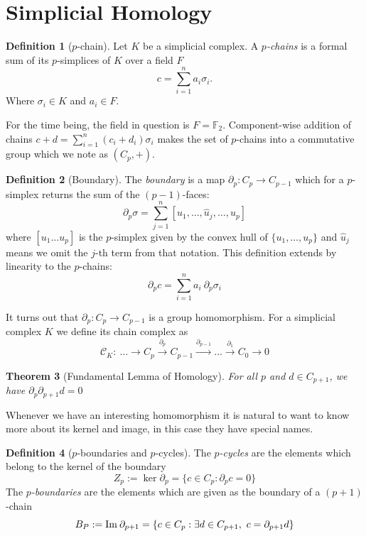 \documentclass{article}
\newcommand{\img}{\textmd{Im}\:}
\theoremstyle{plain}
\newtheorem{thm}{Theorem}[section]
\theoremstyle{definition}
\newtheorem{definition}[thm]{Definition}
\theoremstyle{remark}
\begin{document}
	\section{Simplicial Homology}
	\begin{definition}[$p$-chain]
		Let $K$ be a simplicial complex. A \emph{$ p $-chains} is a formal sum of its $p$-simplices of $K$ over a field $F$ \[ c = \sum_{i=1}^{n} a_i \sigma_i. \] Where $\sigma_i \in K$ and $a_i \in F$.
	\end{definition}
	For the time being, the field in question is $F = \mathbb{F}_2 $. Component-wise addition of chains $ c + d = \sum_{i=1}^n (c_i + d_i) \sigma_i $ makes the set of $p$-chains into a commutative group which we note as $ (C_p, +) $.
\begin{definition}[Boundary]
	The \emph{boundary} is a map $ \partial_p : C_p \to C_{p-1} $ which for a $p$-simplex returns the sum of the $ (p-1) $-faces: \[ \partial_p \sigma = \sum_{j=1}^n [u_1, \dots , \hat{u}_j , \dots , u_p] \]
	where $[ u_1 \dots u_p ]$ is the $p$-simplex given by the convex hull of $\{u_1, \dots , u_p\}$ and $\hat{u}_j$ means we omit the $j$-th term from that notation.
	This definition extends by linearity to the $p$-chains: \[ \partial_p c = \sum_{i=1}^{n} a_i \ \partial_p\sigma_i  \]
\end{definition}
It turns out that $ \partial_p : C_p \to C_{p-1} $ is a group homomorphism. For a simplicial complex $K$ we define its chain complex as
\[\mathcal{C}_K: \ \dots \longrightarrow C_p \stackrel{\partial_p}{\longrightarrow} C_{p-1} \stackrel{\partial_{p-1}}{\longrightarrow} \dots \stackrel{\partial_1}{\longrightarrow} C_0 \longrightarrow 0 \]

\begin{thm}[Fundamental Lemma of Homology]For all $p$ and $d \in C_{p+1}$, we have $ \partial_{p} \partial_{p+1} d = 0$
\end{thm}

Whenever we have an interesting homomorphism it is natural to want to know more about its kernel and image, in this case they have special names.

\begin{definition}[$p$-boundaries and $p$-cycles]
	The \emph{$p$-cycles} are the elements which belong to the kernel of the boundary \[Z_p:= \ker\partial_{p} = \{ c \in C_p : \partial_p c = 0 \} \]
	The \emph{$p$-boundaries} are the elements which are given as the boundary of a $(p+1)$-chain \[B_P := \img\partial_{p+1} = \{ c \in C_p : \exists d \in C_{p+1} , \ c=\partial_{p+1} d \} \]
\end{definition}
\end{document}
